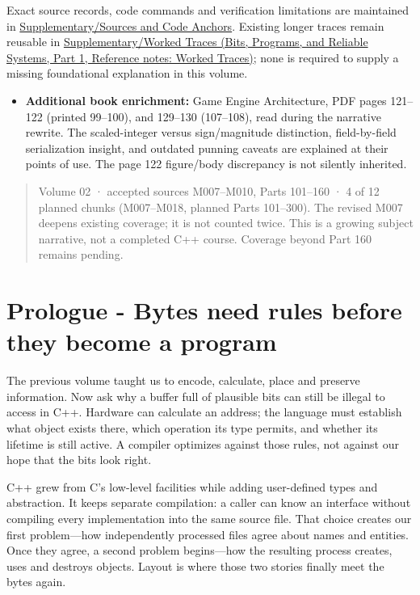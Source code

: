 Exact source records, code commands and verification limitations are maintained in \hyperref[appendix-a103e7846d21]{Supplementary/Sources and Code Anchors}. Existing longer traces remain reusable in \href{../01-Bits-Programs-and-Reliable-Systems-P01/main.pdf\#appendix-92ff77d4dfdc}{Supplementary/Worked Traces (Bits, Programs, and Reliable Systems, Part 1, Reference notes: Worked Traces)}; none is required to supply a missing foundational explanation in this volume.

\begin{itemize}
\tightlist
\item
  \textbf{Additional book enrichment:} Game Engine Architecture, PDF pages 121--122 (printed 99--100), and 129--130 (107--108), read during the narrative rewrite. The scaled-integer versus sign/magnitude distinction, field-by-field serialization insight, and outdated punning caveats are explained at their points of use. The page 122 figure/body discrepancy is not silently inherited.
\end{itemize}

\begin{quote}
Volume 02 · accepted sources M007--M010, Parts 101--160 · 4 of 12 planned chunks (M007--M018, planned Parts 101--300). The revised M007 deepens existing coverage; it is not counted twice. This is a growing subject narrative, not a completed C++ course. Coverage beyond Part 160 remains pending.
\end{quote}

\section{Prologue - Bytes need rules before they become a program}\label{01-foundations-i-ch002-prologue---bytes-need-rules-before-they-become-a-program}

\hypertarget{01-foundations-i-ch002-prologue---bytes-need-rules-before-they-become-a-program}{}

The previous volume taught us to encode, calculate, place and preserve information. Now ask why a buffer full of plausible bits can still be illegal to access in C++. Hardware can calculate an address; the language must establish what object exists there, which operation its type permits, and whether its lifetime is still active. A compiler optimizes against those rules, not against our hope that the bits look right.

C++ grew from C's low-level facilities while adding user-defined types and abstraction. It keeps separate compilation: a caller can know an interface without compiling every implementation into the same source file. That choice creates our first problem---how independently processed files agree about names and entities. Once they agree, a second problem begins---how the resulting process creates, uses and destroys objects. Layout is where those two stories finally meet the bytes again.

